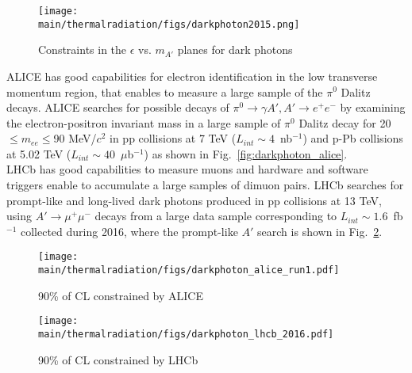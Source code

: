 \documentclass[../report.tex]{subfiles}
\providecommand{\main}{..}
\begin{document}
\begin{figure}[htb]
\centering
\texttt{[image: \\main/thermalradiation/figs/darkphoton2015.png]}
\caption{Constraints in the $\epsilon$ vs. $m_{A'}$ planes for dark photons}
\label{fig:darkphoton2016}
\end{figure}

ALICE has good capabilities for electron identification in the low 
transverse momentum region, that enables to measure a large sample of 
the $\pi^0$ Dalitz decays. 
ALICE searches for possible decays of 
$\pi^0 \rightarrow \gamma A', A' \rightarrow e^+e^-$ 
by examining the electron-positron invariant mass in a large sample
of $\pi^0$ Dalitz decay for 20 $\le m_{ee} \le $90 MeV/$c^2$ in 
pp collisions at 7 TeV ($L_{int} \sim 4$~nb$^{-1}$) and 
p-Pb collisions at 5.02 TeV ($L_{int} \sim 40$~$\mu$b$^{-1}$) as shown in 
Fig.~\ref{fig:darkphoton_alice}.\\
LHCb has good capabilities to measure muons and hardware and software 
triggers enable to accumulate a large samples of dimuon pairs. 
LHCb searches for prompt-like and long-lived dark photons 
produced in pp collisions at 13 TeV, using $A' \rightarrow \mu^+\mu^-$ decays 
from a large data sample corresponding to $L_{int} \sim 1.6$~fb$^{-1}$ 
collected during 2016, where 
the prompt-like $A'$ search is shown in Fig.~\ref{fig:darkphoton_lhcb}.

\begin{figure}[htbp]
 \begin{minipage}{0.5\hsize}
  \begin{center}
   \texttt{[image: \\main/thermalradiation/figs/darkphoton\_alice\_run1.pdf]}
  \end{center}
  \caption{90\% of CL constrained by ALICE}
  \label{fig:darkphoton_alice}
 \end{minipage}
 \begin{minipage}{0.5\hsize}
  \begin{center}
   \texttt{[image: \\main/thermalradiation/figs/darkphoton\_lhcb\_2016.pdf]}
  \end{center}
  \caption{90\% of CL constrained by LHCb}
  \label{fig:darkphoton_lhcb}
 \end{minipage}
\end{figure}
\end{document}

